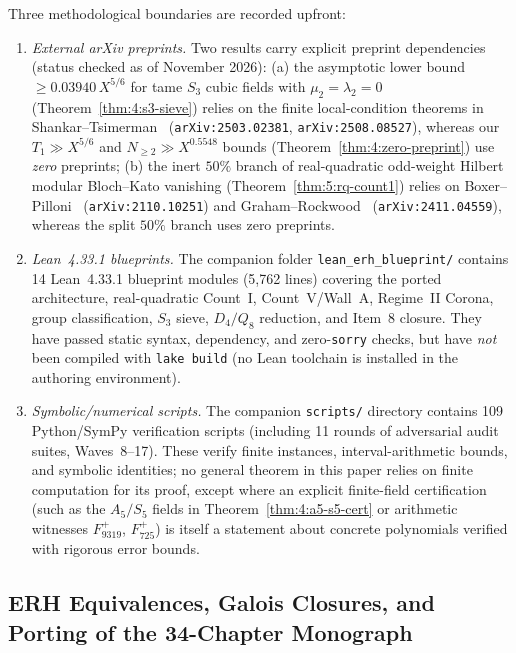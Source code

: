 \begin{remark}\label{rem:1:disclosure}
Three methodological boundaries are recorded upfront:
\begin{enumerate}[label=\textup{(\roman*)}]
\item \emph{External arXiv preprints.} Two results carry explicit preprint dependencies (status checked as of November 2026): (a) the asymptotic lower bound $\ge 0.03940\, X^{5/6}$ for tame $S_3$ cubic fields with $\mu_2 = \lambda_2 = 0$ (Theorem~\ref{thm:4:s3-sieve}) relies on the finite local-condition theorems in Shankar--Tsimerman~\cite{ST2025a,ST2025b} (\texttt{arXiv:2503.02381}, \texttt{arXiv:2508.08527}), whereas our $T_1 \gg X^{5/6}$ and $N_{\ge 2} \gg X^{0.5548}$ bounds (Theorem~\ref{thm:4:zero-preprint}) use \emph{zero} preprints; (b) the inert $50\%$ branch of real-quadratic odd-weight Hilbert modular Bloch--Kato vanishing (Theorem~\ref{thm:5:rq-count1}) relies on Boxer--Pilloni~\cite{BP2021} (\texttt{arXiv:2110.10251}) and Graham--Rockwood~\cite{GR2024} (\texttt{arXiv:2411.04559}), whereas the split $50\%$ branch uses zero preprints.
\item \emph{Lean~4.33.1 blueprints.} The companion folder \texttt{lean\_erh\_blueprint/} contains 14 Lean~4.33.1 blueprint modules (5,762 lines) covering the ported architecture, real-quadratic Count~I, Count~V/Wall~A, Regime~II Corona, group classification, $S_3$ sieve, $D_4/Q_8$ reduction, and Item~8 closure. They have passed static syntax, dependency, and zero-\texttt{sorry} checks, but have \emph{not} been compiled with \texttt{lake build} (no Lean toolchain is installed in the authoring environment).
\item \emph{Symbolic/numerical scripts.} The companion \texttt{scripts/} directory contains 109 Python/SymPy verification scripts (including 11 rounds of adversarial audit suites, Waves~8--17). These verify finite instances, interval-arithmetic bounds, and symbolic identities; no general theorem in this paper relies on finite computation for its proof, except where an explicit finite-field certification (such as the $A_5/S_5$ fields in Theorem~\ref{thm:4:a5-s5-cert} or arithmetic witnesses $F_{9319}^+$, $F_{725}^+$) is itself a statement about concrete polynomials verified with rigorous error bounds.
\end{enumerate}
\end{remark}

\subsection{ERH Equivalences, Galois Closures, and Porting of the 34-Chapter Monograph}\label{sec:1:port}


